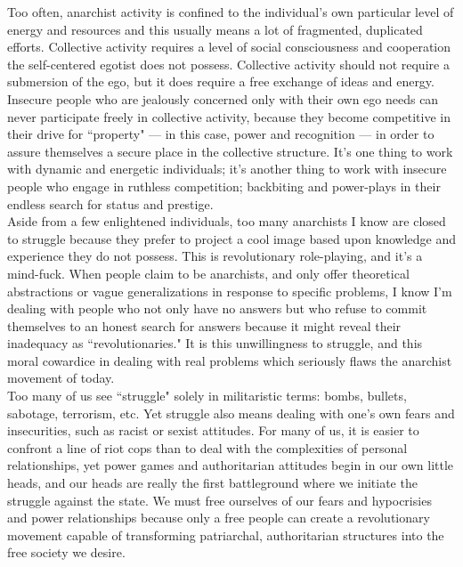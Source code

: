 \documentclass[12pt, onecolumn, letterpaper, oneside]{book}
\begin{document}
Too often, anarchist activity is confined to the individual's own particular level of energy and resources and this usually means a lot of fragmented, duplicated efforts. Collective activity requires a level of social consciousness and cooperation the self-centered egotist does not possess. Collective activity should not require a submersion of the ego, but it does require a free exchange of ideas and energy. Insecure people who are jealously concerned only with their own ego needs can never participate freely in collective activity, because they become competitive in their drive for ``property" --- in this case, power and recognition --- in order to assure themselves a secure place in the collective structure. It's one thing to work with dynamic and energetic individuals; it's another thing to work with insecure people who engage in ruthless competition; backbiting and power-plays in their endless search for status and prestige.\\
Aside from a few enlightened individuals, too many anarchists I know are closed to struggle because they prefer to project a cool image based upon knowledge and experience they do not possess. This is revolutionary role-playing, and it's a mind-fuck. When people claim to be anarchists, and only offer theoretical abstractions or vague generalizations in response to specific problems, I know I'm dealing with people who not only have no answers but who refuse to commit themselves to an honest search for answers because it might reveal their inadequacy as ``revolutionaries." It is this unwillingness to struggle, and this moral cowardice in dealing with real problems which seriously flaws the anarchist movement of today.\\
Too many of us see ``struggle" solely in militaristic terms: bombs, bullets, sabotage, terrorism, etc. Yet struggle also means dealing with one's own fears and insecurities, such as racist or sexist attitudes. For many of us, it is easier to confront a line of riot cops than to deal with the complexities of personal relationships, yet power games and authoritarian attitudes begin in our own little heads, and our heads are really the first battleground where we initiate the struggle against the state. We must free ourselves of our fears and hypocrisies and power relationships because only a free people can create a revolutionary movement capable of transforming patriarchal, authoritarian structures into the free society we desire.\\
\end{document}
